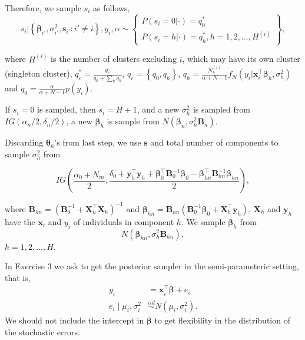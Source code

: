 Therefore, we sample $s_i$ as follows,
\begin{equation*}
	s_i|\left\{\boldsymbol\beta_{i'},\sigma_{i'}^2,\boldsymbol s_{i'}:i'\neq i\right\}, y_i, \alpha\sim\begin{Bmatrix}P(s_i=0|\cdot)=q_0^*\\
		P(s_i=h|\cdot)=q_h^*, h=1,2,\dots,H^{(i)}\end{Bmatrix},
\end{equation*}

where $H^{(i)}$ is the number of clusters excluding $i$, which may have its own cluster (singleton cluster), $q^*_c=\frac{q_c}{q_0+\sum_h q_h}$, $q_c=\left\{q_0,q_h\right\}$, $q_h=\frac{N_h^{(i)}}{\alpha+N-1}f_N(y_i|\boldsymbol{x}_i^{\top}\boldsymbol\beta_h,\sigma_h^2)$ and $q_0=\frac{\alpha}{\alpha+N-1}p(y_i)$.

If $s_i=0$ is sampled, then $s_i=H+1$, and a new $\sigma_h^2$ is sampled from $IG\left(\alpha_n/2,\delta_n/2\right)$, a new $\boldsymbol\beta_h$ is sample from $N(\boldsymbol\beta_n,\sigma_h^2\boldsymbol B_n)$.

Discarding $\boldsymbol\theta_h$'s from last step, we use $\boldsymbol s$ and total number of components to sample $\sigma_h^2$ from 

\begin{equation*}
	IG\left(\frac{\alpha_0+N_m}{2},\frac{\delta_0+\boldsymbol y_h^{\top}\boldsymbol y_h+\boldsymbol{\beta}_0^{\top}{\boldsymbol{B}}_0^{-1}\boldsymbol{\beta}_0-\boldsymbol{\beta}_{hn}^{\top}{\boldsymbol{B}}_{hn}^{-1}\boldsymbol{\beta}_{hn}}{2}\right),
\end{equation*}

where $\boldsymbol{B}_{hn}=(\boldsymbol{B}_0^{-1}+\boldsymbol{X}_h^{\top}\boldsymbol{X}_h)^{-1}$ and $\boldsymbol{\beta}_{hn}=\boldsymbol{B}_{hn}(\boldsymbol{B}_0^{-1}\boldsymbol{\beta}_0+\boldsymbol{X}_h^{\top}\boldsymbol{y}_h)$, $\boldsymbol{X}_h$ and $\boldsymbol{y}_h$ have the $\boldsymbol{x}_i$ and $y_i$ of individuals in component $h$. We sample $\boldsymbol\beta_h$ from
\begin{equation*}
	N\left({\boldsymbol\beta}_{hn},\sigma_h^2\boldsymbol B_{hn}\right),
\end{equation*}
$h=1,2,\dots,H$.

In Exercise 3 we ask to get the posterior sampler in the semi-parameteric setting, that is,
\begin{align*}
	y_i&=\boldsymbol{x}_i^{\top}\boldsymbol{\beta}+e_i\\
	e_i\mid \mu_i,\sigma_i^2 &\stackrel{iid}{\sim} N(\mu_i,\sigma_i^2).
\end{align*}
We should not include the intercept in $\boldsymbol{\beta}$ to get flexibility in the distribution of the stochastic errors. 

